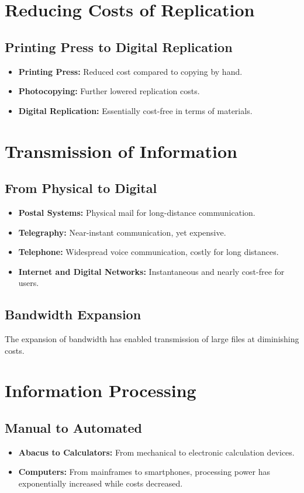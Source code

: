 \documentclass[12pt,titlepage]{book}
\begin{document}
\section{Reducing Costs of Replication}

\subsection{Printing Press to Digital Replication}
\begin{itemize}
    \item \textbf{Printing Press:} Reduced cost compared to copying by hand.
    \item \textbf{Photocopying:} Further lowered replication costs.
    \item \textbf{Digital Replication:} Essentially cost-free in terms of materials.
\end{itemize}

\section{Transmission of Information}

\subsection{From Physical to Digital}
\begin{itemize}
    \item \textbf{Postal Systems:} Physical mail for long-distance communication.
    \item \textbf{Telegraphy:} Near-instant communication, yet expensive.
    \item \textbf{Telephone:} Widespread voice communication, costly for long distances.
    \item \textbf{Internet and Digital Networks:} Instantaneous and nearly cost-free for users.
\end{itemize}

\subsection{Bandwidth Expansion}
The expansion of bandwidth has enabled transmission of large files at diminishing costs.

\section{Information Processing}

\subsection{Manual to Automated}
\begin{itemize}
    \item \textbf{Abacus to Calculators:} From mechanical to electronic calculation devices.
    \item \textbf{Computers:} From mainframes to smartphones, processing power has exponentially increased while costs decreased.
\end{itemize}
\end{document}
